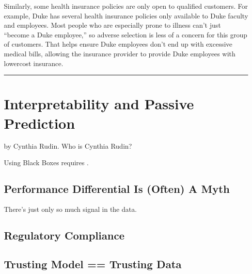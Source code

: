 \documentclass[letterpaper,10pt,english]{jupyterBook}
\begin{document}
\sphinxAtStartPar
Similarly, some health insurance policies are only open to qualified customers. For example, Duke has several health insurance policies only available to Duke faculty and employees. Most people who are especially prone to illness can’t just “become a Duke employee,” so adverse selection is less of a concern for this group of customers. That helps ensure Duke employees don’t end up with excessive medical bills, allowing the insurance provider to provide Duke employees with lower\sphinxhyphen{}cost insurance.


\bigskip\hrule\bigskip


\sphinxstepscope


\chapter{Interpretability and Passive Prediction}
\label{\detokenize{30_questions/32_passive_interpretable_models:interpretability-and-passive-prediction}}\label{\detokenize{30_questions/32_passive_interpretable_models::doc}}
\sphinxAtStartPar
{} by Cynthia Rudin. Who is Cynthia Rudin? 

\sphinxAtStartPar
Using Black Boxes requires .


\section{Performance Differential Is (Often) A Myth}
\label{\detokenize{30_questions/32_passive_interpretable_models:performance-differential-is-often-a-myth}}
\sphinxAtStartPar
There’s just only so much signal in the data.


\section{Regulatory Compliance}
\label{\detokenize{30_questions/32_passive_interpretable_models:regulatory-compliance}}

\section{Trusting Model == Trusting Data}
\label{\detokenize{30_questions/32_passive_interpretable_models:trusting-model-trusting-data}}
\end{document}
